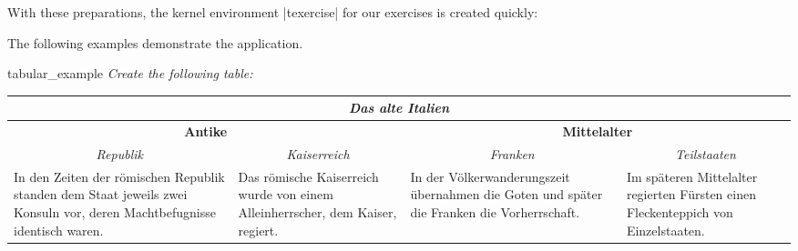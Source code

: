 \begin{dispListing}
\end{dispListing}
\tcbusetemp

With these preparations, the kernel environment |texercise| for our
exercises is created quickly:


\clearpage
The following examples demonstrate the application.

\begin{dispListing}
\tcbstartrecording
\end{dispListing}
\tcbusetemp


\begin{dispExample}
\begin{texercise}{tabular_example}
\textit{Create the following table:}\par\smallskip%
\begin{tcboutputlisting}
\begin{tabular}{|p{3cm}|p{3cm}|p{3cm}|p{3cm}|}\hline
\multicolumn{4}{|c|}{\bfseries\itshape Das alte Italien}\\\hline
\multicolumn{2}{|c|}{\bfseries Antike} &
\multicolumn{2}{c|}{\bfseries Mittelalter}\\\hline
\multicolumn{1}{|c|}{\itshape Republik}&
\multicolumn{1}{c|}{\itshape Kaiserreich}&
\multicolumn{1}{c|}{\itshape Franken}&
\multicolumn{1}{c|}{\itshape Teilstaaten}\\\hline
In den Zeiten der r\"{o}mischen Republik standen dem Staat jeweils zwei
Konsuln vor, deren Machtbefugnisse identisch waren. &
Das r\"{o}mische Kaiserreich wurde von einem Alleinherrscher, dem Kaiser,
regiert.
& In der V\"{o}lkerwanderungszeit \"{u}bernahmen die Goten und sp\"{a}ter die
Franken die Vorherrschaft.
& Im sp\"{a}teren Mittelalter regierten F\"{u}rsten einen Fleckenteppich
von Einzelstaaten.\\\hline
\end{tabular}
\end{tcboutputlisting}
\tcbuselistingtext%
\end{texercise}
\end{dispExample}


